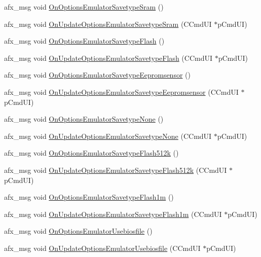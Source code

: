 \begin{DoxyCompactItemize}
\item 
afx\+\_\+msg void \mbox{\hyperlink{class_main_wnd_a3599dc0ef10dceab417ada2584cb18e6}{On\+Options\+Emulator\+Savetype\+Sram}} ()
\item 
afx\+\_\+msg void \mbox{\hyperlink{class_main_wnd_a8ad77ce8b5d29f009b9086f708ae2aba}{On\+Update\+Options\+Emulator\+Savetype\+Sram}} (C\+Cmd\+UI $\ast$p\+Cmd\+UI)
\item 
afx\+\_\+msg void \mbox{\hyperlink{class_main_wnd_aa52cbad3383a4f2d0f05f4c8e2e5f556}{On\+Options\+Emulator\+Savetype\+Flash}} ()
\item 
afx\+\_\+msg void \mbox{\hyperlink{class_main_wnd_a70b80fcf494b4d70c006956144170803}{On\+Update\+Options\+Emulator\+Savetype\+Flash}} (C\+Cmd\+UI $\ast$p\+Cmd\+UI)
\item 
afx\+\_\+msg void \mbox{\hyperlink{class_main_wnd_ac623d029d6d33c1c8e22fbb671725558}{On\+Options\+Emulator\+Savetype\+Eepromsensor}} ()
\item 
afx\+\_\+msg void \mbox{\hyperlink{class_main_wnd_afc4b0435b25dfd00d358f2ad05b5193a}{On\+Update\+Options\+Emulator\+Savetype\+Eepromsensor}} (C\+Cmd\+UI $\ast$p\+Cmd\+UI)
\item 
afx\+\_\+msg void \mbox{\hyperlink{class_main_wnd_a41903300d898006e3d52466dd2ceb283}{On\+Options\+Emulator\+Savetype\+None}} ()
\item 
afx\+\_\+msg void \mbox{\hyperlink{class_main_wnd_acd01898bd8817e39f36dbd01d940dfc9}{On\+Update\+Options\+Emulator\+Savetype\+None}} (C\+Cmd\+UI $\ast$p\+Cmd\+UI)
\item 
afx\+\_\+msg void \mbox{\hyperlink{class_main_wnd_a10c98fcb234998c2d621585d4b244451}{On\+Options\+Emulator\+Savetype\+Flash512k}} ()
\item 
afx\+\_\+msg void \mbox{\hyperlink{class_main_wnd_ae2bb26c3109ad3cb4cdd3a81b2584477}{On\+Update\+Options\+Emulator\+Savetype\+Flash512k}} (C\+Cmd\+UI $\ast$p\+Cmd\+UI)
\item 
afx\+\_\+msg void \mbox{\hyperlink{class_main_wnd_ac70aeadfab0e7ed9120a03f11564f56c}{On\+Options\+Emulator\+Savetype\+Flash1m}} ()
\item 
afx\+\_\+msg void \mbox{\hyperlink{class_main_wnd_a9626a5265957c4674aff99fec01356bf}{On\+Update\+Options\+Emulator\+Savetype\+Flash1m}} (C\+Cmd\+UI $\ast$p\+Cmd\+UI)
\item 
afx\+\_\+msg void \mbox{\hyperlink{class_main_wnd_a26ef871056784bfd1f22efd86dc96991}{On\+Options\+Emulator\+Usebiosfile}} ()
\item 
afx\+\_\+msg void \mbox{\hyperlink{class_main_wnd_a602a9a86e5cc8e903fbf201a4478a3bc}{On\+Update\+Options\+Emulator\+Usebiosfile}} (C\+Cmd\+UI $\ast$p\+Cmd\+UI)

\end{DoxyCompactItemize}
